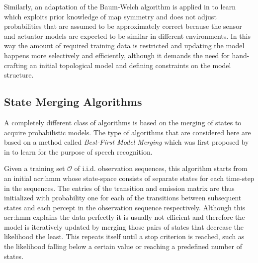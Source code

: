 Similarly, an adaptation of the Baum-Welch algorithm is applied in \cite{koenig1996unsupervised} to learn  which exploits prior knowledge of map symmetry and does not adjust probabilities that are assumed to be approximately correct because the sensor and actuator models are expected to be similar in different environments.
In this way the amount of required training data is restricted and updating the model happens more selectively and efficiently, although it demands the need for hand-crafting an initial topological model and defining constraints on the model structure.


\subsection{State Merging Algorithms}
\label{sec:state-merging}

A completely different class of algorithms is based on the merging of states to acquire probabilistic models.
The type of algorithms that are considered here are based on a method called \textit{Best-First Model Merging} which was first proposed by \citeauthor{stolcke1994best} in \cite{stolcke1994best} to learn  for the purpose of speech recognition.

Given a training set $\mathcal{O}$ of i.i.d. observation sequences, this algorithm starts from an initial \acrshort{acr:hmm} whose state-space consists of separate states for each time-step in the sequences.
The entries of the transition and emission matrix are thus initialized with probability one for each of the transitions between subsequent states and each percept in the observation sequence respectively.
Although this \acrshort{acr:hmm} explains the data perfectly it is usually not efficient and therefore the model is iteratively updated by merging those pairs of states that decrease the likelihood the least.
This repeats itself until a stop criterion is reached, such as the likelihood falling below a certain value or reaching a predefined number of states.

